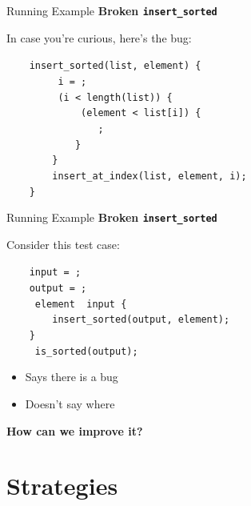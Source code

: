 \documentclass[xcolor=dvipsnames]{beamer}
\begin{document}
\begin{frame}{Running Example}
	\textbf{Broken \texttt{insert\_sorted}}

	\linegap
	In case you're curious, here's the bug:

	\linegap
		\texttt{~~~~insert\_sorted(list,~element)~\{} \\
			\texttt{~~~~~~~~~i~=~;} \\
		\texttt{~~~~~~~~~(i~<~length(list))~\{~} \\
		\texttt{~~~~~~~~~~~~~(element~<~list[i])~\{} \\
		\texttt{~~~~~~~~~~~~~~~~;} \\
		\texttt{~~~~~~~~~~~~\}} \\
		\texttt{~~~~~~~~\}} \\
		\texttt{~~~~~~~~insert\_at\_index(list,~element,~i);} \\
		\texttt{~~~~\}} \\
\end{frame}

\begin{frame}{Running Example}
	\textbf{Broken \texttt{insert\_sorted}}

	\linegap
	Consider this test case:

	\linegap
		\texttt{~~~~input~=~;} \\
		\texttt{~~~~output~=~;} \\
		\texttt{~~~~~element~~input~\{} \\
		\texttt{~~~~~~~~insert\_sorted(output,~element);} \\
		\texttt{~~~~\}} \\
		\texttt{~~~~~is\_sorted(output);~} \\
	\linegap

	\pause
	\begin{itemize}
		\item Says there is a bug
		\item Doesn't say where
	\end{itemize}
	\pause
	{\bf How can we improve it?}
\end{frame}

\section{Strategies}
\end{document}
